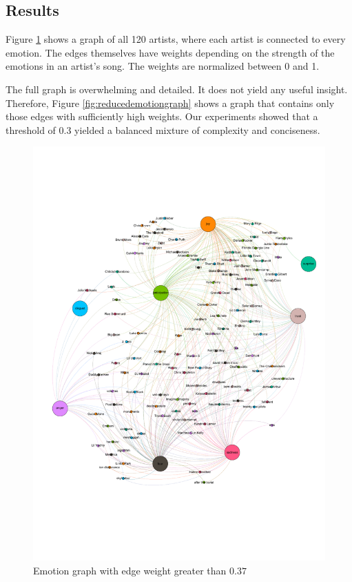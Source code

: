 \documentclass[10pt,a4paper]{article}
\begin{document}
		\subsection{Results}
		Figure \ref{fig:emotiongraph} shows a graph of all 120 artists, where each artist is connected to every emotion. The edges themselves have weights depending on the strength of the emotions in an artist's song. The weights are normalized between 0 and 1.
		
		The full graph is overwhelming and detailed. It does not yield any useful insight. Therefore, Figure \ref{fig:reducedemotiongraph} shows a graph that contains only those edges with sufficiently high weights. Our experiments showed that a threshold of $0.3$ yielded a balanced mixture of complexity and conciseness.
		
		\begin{figure}[htb]
			\centering
			\includegraphics[trim=0mm 50mm 0mm 50mm, clip, width=\linewidth]{data/emotion_graph}
			\caption{Emotion graph with edge weight greater than $0.37$}
			\label{fig:emotiongraph}
		\end{figure}
		
\end{document}
